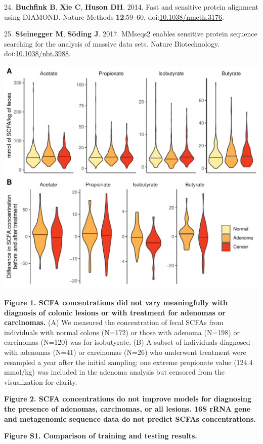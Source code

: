 \documentclass[11pt,]{article}
\begin{document}
\leavevmode\hypertarget{ref-Buchfink2014}{}%
24. \textbf{Buchfink B}, \textbf{Xie C}, \textbf{Huson DH}. 2014. Fast
and sensitive protein alignment using DIAMOND. Nature Methods
\textbf{12}:59--60.
doi:\href{https://doi.org/10.1038/nmeth.3176}{10.1038/nmeth.3176}.

\leavevmode\hypertarget{ref-Steinegger2017}{}%
25. \textbf{Steinegger M}, \textbf{Söding J}. 2017. MMseqs2 enables
sensitive protein sequence searching for the analysis of massive data
sets. Nature Biotechnology.
doi:\href{https://doi.org/10.1038/nbt.3988}{10.1038/nbt.3988}.

\newpage

\includegraphics{../results/figures/scfa_abundance.pdf}

\textbf{Figure 1. SCFA concentrations did not vary meaningfully with
diagnosis of colonic lesions or with treatment for adenomas or
carcinomas.} (A) We measured the concentration of fecal SCFAs from
individuals with normal colons (N=172) or those with adenoma (N=198) or
carcinomas (N=120) was for isobutyrate. (B) A subset of individuals
diagnosed with adenomas (N=41) or carcinomas (N=26) who underwent
treatment were resampled a year after the initial sampling; one extreme
propionate value (124.4 mmol/kg) was included in the adenoma analysis
but censored from the visualization for clarity.

\newpage

\textbf{Figure 2. SCFA concentrations do not improve models for
diagnosing the presence of adenomas, carcinomas, or all lesions. 16S
rRNA gene and metagenomic sequence data do not predict SCFAs
concentrations.}

\newpage

\textbf{Figure S1. Comparison of training and testing results.}
\end{document}

